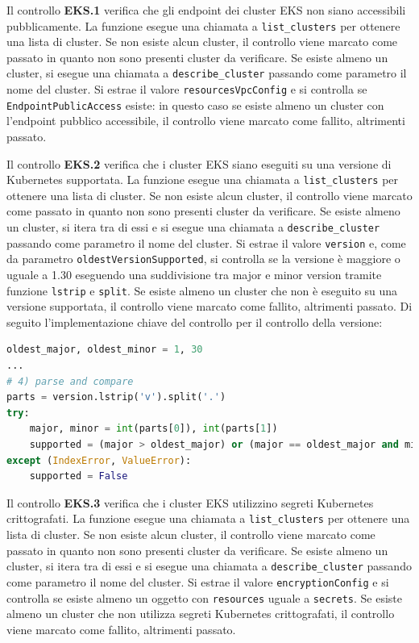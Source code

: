 Il controllo \textbf{EKS.1} verifica che gli endpoint dei cluster EKS non siano accessibili pubblicamente. La funzione esegue una chiamata a \texttt{list\_clusters} per ottenere una lista di cluster. Se non esiste alcun cluster, il controllo viene marcato come passato in quanto non sono presenti cluster da verificare. Se esiste almeno un cluster, si esegue una chiamata a \texttt{describe\_cluster} passando come parametro il nome del cluster. Si estrae il valore \texttt{resourcesVpcConfig} e si controlla se \texttt{EndpointPublicAccess} esiste: in questo caso se esiste almeno un cluster con l'endpoint pubblico accessibile, il controllo viene marcato come fallito, altrimenti passato.

Il controllo \textbf{EKS.2} verifica che i cluster EKS siano eseguiti su una versione di Kubernetes supportata. La funzione esegue una chiamata a \texttt{list\_clusters} per ottenere una lista di cluster. Se non esiste alcun cluster, il controllo viene marcato come passato in quanto non sono presenti cluster da verificare. Se esiste almeno un cluster, si itera tra di essi e si esegue una chiamata a \texttt{describe\_cluster} passando come parametro il nome del cluster. Si estrae il valore \texttt{version} e, come da parametro \texttt{oldestVersionSupported}, si controlla se la versione è maggiore o uguale a 1.30 eseguendo una suddivisione tra major e minor version tramite funzione \texttt{lstrip} e \texttt{split}. Se esiste almeno un cluster che non è eseguito su una versione supportata, il controllo viene marcato come fallito, altrimenti passato. Di seguito l'implementazione chiave del controllo per il controllo della versione:
\begin{lstlisting}[language=Python, caption={Controllo della versione di Kubernetes supportata in EKS}]
oldest_major, oldest_minor = 1, 30
...
# 4) parse and compare
parts = version.lstrip('v').split('.')
try:
    major, minor = int(parts[0]), int(parts[1])
    supported = (major > oldest_major) or (major == oldest_major and minor >= oldest_minor)
except (IndexError, ValueError):
    supported = False
\end{lstlisting}

Il controllo \textbf{EKS.3} verifica che i cluster EKS utilizzino segreti Kubernetes crittografati. La funzione esegue una chiamata a \texttt{list\_clusters} per ottenere una lista di cluster. Se non esiste alcun cluster, il controllo viene marcato come passato in quanto non sono presenti cluster da verificare. Se esiste almeno un cluster, si itera tra di essi e si esegue una chiamata a \texttt{describe\_cluster} passando come parametro il nome del cluster. Si estrae il valore \texttt{encryptionConfig} e si controlla se esiste almeno un oggetto con \texttt{resources} uguale a \texttt{secrets}. Se esiste almeno un cluster che non utilizza segreti Kubernetes crittografati, il controllo viene marcato come fallito, altrimenti passato.

